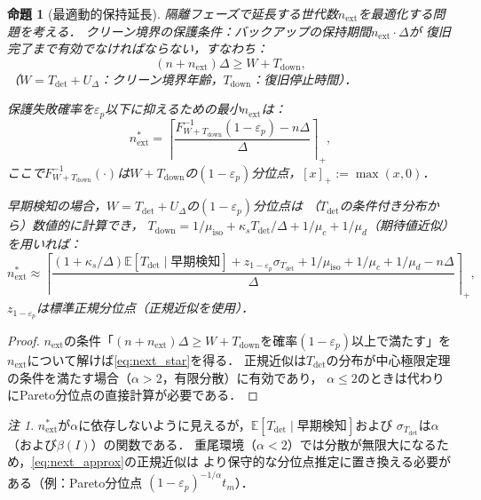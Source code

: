 \documentclass[12pt,a4paper]{article}
\theoremstyle{plain}
\newtheorem{proposition}[theorem]{命題}
\theoremstyle{definition}
\theoremstyle{remark}
\newtheorem{remark}[theorem]{注}
\newcommand{\E}{\mathbb{E}}
\newcommand{\Tdown}{T_{\mathrm{down}}}
\newcommand{\betaI}{\beta(I)}
\begin{document}
\begin{proposition}[最適動的保持延長]\label{prop:next}
隔離フェーズで延長する世代数$n_{\mathrm{ext}}$を最適化する問題を考える．
クリーン境界の保護条件：バックアップの保持期間$n_{\mathrm{ext}}\cdot\Delta$が
復旧完了まで有効でなければならない，すなわち：
\[
  (n+n_{\mathrm{ext}})\Delta \ge W + \Tdown,
\]
（$W=T_{\mathrm{det}}+U_\Delta$：クリーン境界年齢，$\Tdown$：復旧停止時間）．

保護失敗確率を$\varepsilon_p$以下に抑えるための最小$n_{\mathrm{ext}}$は：
\begin{equation}\label{eq:next_star}
  n_{\mathrm{ext}}^* = \left\lceil\frac{F_{W+\Tdown}^{-1}(1-\varepsilon_p) - n\Delta}{\Delta}\right\rceil_+,
\end{equation}
ここで$F_{W+\Tdown}^{-1}(\cdot)$は$W+\Tdown$の$(1-\varepsilon_p)$分位点，$[x]_+:=\max(x,0)$．

早期検知の場合，$W=T_{\mathrm{det}}+U_\Delta$の$(1-\varepsilon_p)$分位点は
（$T_{\mathrm{det}}$の条件付き分布から）数値的に計算でき，
$\Tdown=1/\mu_{\mathrm{iso}}+\kappa_s T_{\mathrm{det}}/\Delta+1/\mu_c+1/\mu_d$（期待値近似）を用いれば：
\begin{equation}\label{eq:next_approx}
  n_{\mathrm{ext}}^* \approx \left\lceil
    \frac{(1+\kappa_s/\Delta)\E[T_{\mathrm{det}}\mid\text{早期検知}]
    + z_{1-\varepsilon_p}\sigma_{T_{\mathrm{det}}}
    + 1/\mu_{\mathrm{iso}} + 1/\mu_c + 1/\mu_d - n\Delta}{\Delta}
  \right\rceil_+,
\end{equation}
$z_{1-\varepsilon_p}$は標準正規分位点（正規近似を使用）．
\end{proposition}

\begin{proof}
$n_{\mathrm{ext}}$の条件「$(n+n_{\mathrm{ext}})\Delta\ge W+\Tdown$を確率$(1-\varepsilon_p)$以上で満たす」を
$n_{\mathrm{ext}}$について解けば\eqref{eq:next_star}を得る．
正規近似は$T_{\mathrm{det}}$の分布が中心極限定理の条件を満たす場合（$\alpha>2$，有限分散）に有効であり，
$\alpha\le2$のときは代わりにPareto分位点の直接計算が必要である．
\end{proof}

\begin{remark}
$n_{\mathrm{ext}}^*$が$\alpha$に依存しないように見えるが，$\E[T_{\mathrm{det}}\mid\text{早期検知}]$および
$\sigma_{T_{\mathrm{det}}}$は$\alpha$（および$\betaI$）の関数である．
重尾環境（$\alpha<2$）では分散が無限大になるため，\eqref{eq:next_approx}の正規近似は
より保守的な分位点推定に置き換える必要がある（例：Pareto分位点 $(1-\varepsilon_p)^{-1/\alpha}t_m$）．
\end{remark}
\end{document}
